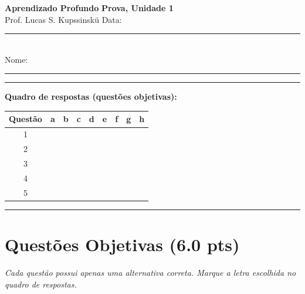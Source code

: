 \documentclass[11pt,a4paper]{article}
\begin{document}
{\Large\bfseries Aprendizado Profundo} \hfill \textbf{Prova, Unidade 1}\\
Prof. Lucas S. Kupssinskü \hfill Data: \rule{3cm}{0.4pt}\\[0.4em]
Nome: \rule{12cm}{0.4pt}

\rule{\linewidth}{0.8pt}

\textbf{Quadro de respostas (questões objetivas):}\\[0.3em]
\begin{center}
\begin{tabular}{|c|c|c|c|c|c|c|c|c|}
\hline
\textbf{Questão} & \textbf{a} & \textbf{b} & \textbf{c} & \textbf{d} & \textbf{e} & \textbf{f} & \textbf{g} & \textbf{h} \\\hline
1 & & & & & & & & \\\hline
2 & & & & & & & & \\\hline
3 & & & & & & & & \\\hline
4 & & & & & & & & \\\hline
5 & & & & & & & & \\\hline
\end{tabular}
\end{center}

\rule{\linewidth}{0.4pt}

\section*{Questões Objetivas (6.0 pts)}
\textit{Cada questão possui apenas uma alternativa correta. Marque a letra escolhida no quadro de respostas.}
\end{document}
